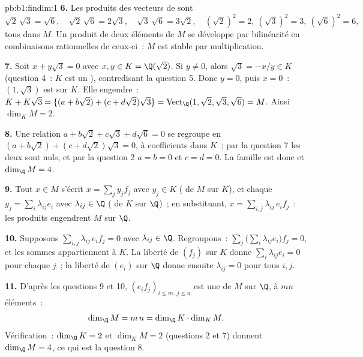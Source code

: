 \begin{solution}{pb:b1:findim:1}
\textbf{6.} Les produits des vecteurs de  sont
\[
\sqrt2\,\sqrt3 = \sqrt6,\quad
\sqrt2\,\sqrt6 = 2\sqrt3,\quad
\sqrt3\,\sqrt6 = 3\sqrt2,\quad
(\sqrt2)^2 = 2,\ (\sqrt3)^2 = 3,\ (\sqrt6)^2 = 6,
\]
tous dans $M$. Un produit de deux éléments de $M$ se développe par
bilinéarité en combinaisons rationnelles de ceux-ci~: $M$ est stable
par multiplication.

\textbf{7.} Soit $x + y\sqrt3 = 0$ avec $x, y \in K = \Q(\sqrt2)$.
Si $y \neq 0$, alors $\sqrt3 = -x/y \in K$ (question 4~: $K$ est un
), contredisant la question 5. Donc $y = 0$, puis $x = 0$~: $(1,
\sqrt3)$ est  sur $K$. Elle engendre~: $K + K\sqrt3 =
\{(a + b\sqrt2) + (c + d\sqrt2)\sqrt3\} = \operatorname{Vect}_\Q
(1, \sqrt2, \sqrt3, \sqrt6) = M$. Ainsi $\dim_K M = 2$.

\textbf{8.} Une relation $a + b\sqrt2 + c\sqrt3 + d\sqrt6 = 0$ se
regroupe en $(a + b\sqrt2) + (c + d\sqrt2)\sqrt3 = 0$, à coefficients
dans $K$~; par la question 7 les deux sont nuls, et par la question 2
$a = b = 0$ et $c = d = 0$. La famille est donc  et $\dim_\Q M
= 4$.

\textbf{9.} Tout $x \in M$ s'écrit $x = \sum_j y_j f_j$ avec $y_j
\in K$ ( de $M$ sur $K$), et chaque $y_j = \sum_i
\lambda_{ij} e_i$ avec $\lambda_{ij} \in \Q$ ( de $K$ sur
$\Q$)~; en substituant, $x = \sum_{i,j} \lambda_{ij}\, e_i f_j$~: les
produits engendrent $M$ sur $\Q$.

\textbf{10.} Supposons $\sum_{i,j} \lambda_{ij}\, e_i f_j = 0$ avec
$\lambda_{ij} \in \Q$. Regroupons~: $\sum_j \bigl(\sum_i \lambda_{ij}
e_i\bigr) f_j = 0$, et les sommes  appartiennent à $K$. La
liberté de $(f_j)$ sur $K$ donne $\sum_i \lambda_{ij} e_i = 0$ pour
chaque $j$~; la liberté de $(e_i)$ sur $\Q$ donne ensuite
$\lambda_{ij} = 0$ pour tous $i, j$.

\textbf{11.} D'après les questions 9 et 10, $(e_i f_j)_{i \leq m,\, j
\leq n}$ est une  de $M$ sur $\Q$, à $mn$ éléments~:
\[
\dim_\Q M = m\,n = \dim_\Q K \cdot \dim_K M .
\]
Vérification~: $\dim_\Q K = 2$ et $\dim_K M = 2$ (questions 2 et 7)
donnent $\dim_\Q M = 4$, ce qui est la question 8.


\end{solution}
